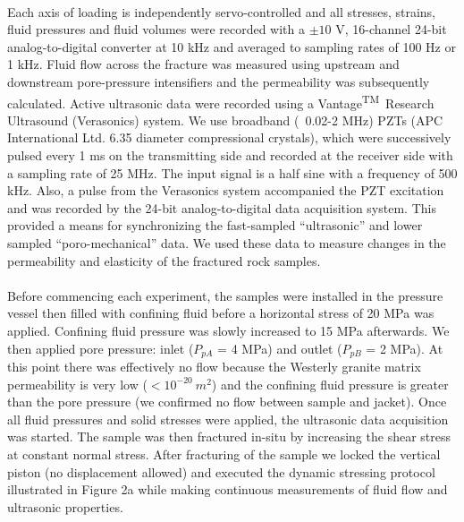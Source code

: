 \documentclass[letterpaper,10pt]{article}
\begin{document}
\paragraph{} Each axis of loading is independently servo-controlled and all stresses, strains, fluid pressures and fluid volumes were recorded with a $\pm10$ V, 16-channel 24-bit analog-to-digital converter at 10 kHz and averaged to sampling rates of 100 Hz or 1 kHz. Fluid flow across the fracture was measured using upstream and downstream pore-pressure intensifiers and the permeability was subsequently calculated. Active ultrasonic data were recorded using a Vantage\textsuperscript{TM}\ Research Ultrasound (Verasonics) system. We use broadband (~0.02-2 MHz) PZTs (APC International Ltd. 6.35 diameter compressional crystals), which were successively pulsed every 1 ms on the transmitting side and recorded at the receiver side with a sampling rate of 25 MHz. The input signal is a half sine with a frequency of 500 kHz. Also, a pulse from the Verasonics system accompanied the PZT excitation and was recorded by the 24-bit analog-to-digital data acquisition system. This provided a means for synchronizing the fast-sampled “ultrasonic” and lower sampled “poro-mechanical” data. We used these data to measure changes in the permeability and elasticity of the fractured rock samples.

\paragraph{} Before commencing each experiment, the samples were installed in the pressure vessel then filled with confining fluid before a horizontal stress of 20 MPa was applied. Confining fluid pressure was slowly increased to 15 MPa afterwards. We then applied pore pressure: inlet ($P_{pA}$ = 4 MPa) and outlet ($P_{pB}$ = 2 MPa). At this point there was effectively no flow because the Westerly granite matrix permeability is very low ($< 10^{-20}\ m^2$) and the confining fluid pressure is greater than the pore pressure (we confirmed no flow between sample and jacket). Once all fluid pressures and solid stresses were applied, the ultrasonic data acquisition was started. The sample was then fractured in-situ by increasing the shear stress at constant normal stress. After fracturing of the sample we locked the vertical piston (no displacement allowed) and executed the dynamic stressing protocol illustrated in Figure 2a while making continuous measurements of fluid flow and ultrasonic properties.
\end{document}
